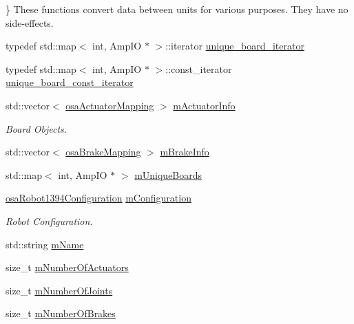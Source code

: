 \} These functions convert data between units for various purposes. They have no side-\/effects. \begin{DoxyCompactItemize}
\item 
typedef std\+::map$<$ int, Amp\+I\+O $\ast$ $>$\+::iterator \hyperlink{classsaw_robot_i_o1394_1_1osa_robot1394_a978238551892ef80ceb59dfdaca46d9d}{unique\+\_\+board\+\_\+iterator}
\item 
typedef std\+::map$<$ int, Amp\+I\+O $\ast$ $>$\+::const\+\_\+iterator \hyperlink{classsaw_robot_i_o1394_1_1osa_robot1394_a01f7b23037caa05ef8fceb96d032d451}{unique\+\_\+board\+\_\+const\+\_\+iterator}
\item 
std\+::vector$<$ \hyperlink{structsaw_robot_i_o1394_1_1osa_actuator_mapping}{osa\+Actuator\+Mapping} $>$ \hyperlink{classsaw_robot_i_o1394_1_1osa_robot1394_a8e50f36a5543dc7106a8500c45fef92e}{m\+Actuator\+Info}
\begin{DoxyCompactList}\small\item\em Board Objects. \end{DoxyCompactList}\item 
std\+::vector$<$ \hyperlink{structsaw_robot_i_o1394_1_1osa_brake_mapping}{osa\+Brake\+Mapping} $>$ \hyperlink{classsaw_robot_i_o1394_1_1osa_robot1394_a24d42b0a3f64f3d123ecb7885bc75b3f}{m\+Brake\+Info}
\item 
std\+::map$<$ int, Amp\+I\+O $\ast$ $>$ \hyperlink{classsaw_robot_i_o1394_1_1osa_robot1394_a70a3fca1526a53bdad88bc037ad70e42}{m\+Unique\+Boards}
\item 
\hyperlink{structsaw_robot_i_o1394_1_1osa_robot1394_configuration}{osa\+Robot1394\+Configuration} \hyperlink{classsaw_robot_i_o1394_1_1osa_robot1394_a9db1624d163768f058e4d883147be328}{m\+Configuration}
\begin{DoxyCompactList}\small\item\em Robot Configuration. \end{DoxyCompactList}\item 
std\+::string \hyperlink{classsaw_robot_i_o1394_1_1osa_robot1394_a58671c0e58211874a910b94d5e818366}{m\+Name}
\item 
size\+\_\+t \hyperlink{classsaw_robot_i_o1394_1_1osa_robot1394_a423086327762984870f709c81eccb17a}{m\+Number\+Of\+Actuators}
\item 
size\+\_\+t \hyperlink{classsaw_robot_i_o1394_1_1osa_robot1394_acc4d11ad6a18d9a9b294371cfce7420a}{m\+Number\+Of\+Joints}
\item 
size\+\_\+t \hyperlink{classsaw_robot_i_o1394_1_1osa_robot1394_aa946b78c2e09f0ad69a1676d5550dcc3}{m\+Number\+Of\+Brakes}

\end{DoxyCompactItemize}
